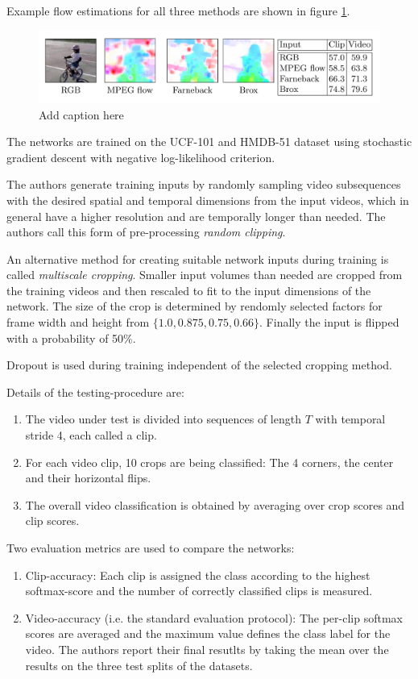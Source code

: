 Example flow estimations for all three methods are shown in figure \ref{fig:longterm_optflow}.

\begin{figure}[H]
    \centering
    \includegraphics[width=\textwidth]{img_deep/longterm_optflow}
    \caption{Add caption here}
    \label{fig:longterm_optflow}
\end{figure}

The networks are trained on the UCF-101 and HMDB-51 dataset using stochastic gradient descent with negative log-likelihood criterion.

The authors generate training inputs by randomly sampling video subsequences with the desired spatial and temporal dimensions from the input videos, which in general have a higher resolution and are temporally longer than needed. The authors call this form of pre-processing \textit{random clipping}.

An alternative method for creating suitable network inputs during training is called \textit{multiscale cropping}.
Smaller input volumes than needed are cropped from the training videos and then rescaled to fit to the input dimensions of the network.
The size of the crop is determined by rendomly selected factors for frame width and height from $\{1.0, 0.875, 0.75, 0.66\}$.
Finally the input is flipped with a probability of 50\%.

Dropout is used during training independent of the selected cropping method.

Details of the testing-procedure are:
\begin{enumerate}
    \item The video under test is divided into sequences of length $T$ with temporal stride 4, each called a clip.
    \item For each video clip, 10 crops are being classified: The 4 corners, the center and their horizontal flips.
    \item The overall video classification is obtained by averaging over crop scores and clip scores.  
\end{enumerate}

Two evaluation metrics are used to compare the networks: 
\begin{enumerate}
    \item Clip-accuracy: Each clip is assigned the class according to the highest softmax-score and the number of correctly classified clips is measured.
    \item Video-accuracy (i.e. the standard evaluation protocol): The per-clip softmax scores are averaged and the maximum value defines the class label for the video. The authors report their final resutlts by taking the mean over the results on the three test splits of the datasets.
\end{enumerate}

